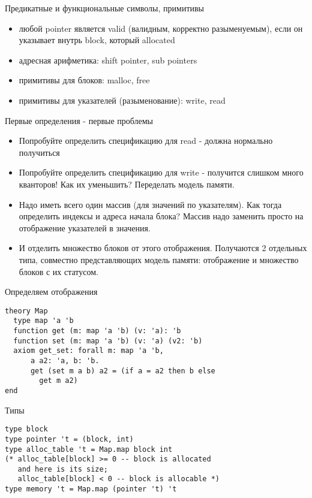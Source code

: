 \documentclass[hyperref={unicode=true}]{beamer}
\begin{document}
    \begin{frame}{Предикатные и функциональные символы, примитивы}
    \begin{itemize}
    \item
    любой pointer является valid (валидным, корректно разыменуемым), если
    он указывает внутрь block, который allocated
    \item
    адресная арифметика: shift pointer, sub pointers
    \item
    примитивы для блоков: malloc, free
    \item
    примитивы для указателей (разыменование): write, read
    \end{itemize}
    \end{frame}

    \begin{frame}{Первые определения - первые проблемы}
    \begin{itemize}
    \item
    Попробуйте определить спецификацию для read - должна нормально получиться
    \item
    Попробуйте определить спецификацию для write - получится слишком
    много кванторов! Как их уменьшить? Переделать модель памяти.
    \item
    Надо иметь всего один массив (для значений по указателям).
    Как тогда определить индексы и адреса начала блока? Массив надо заменить
    просто на отображение указателей в значения.
    \item
    И отделить множество блоков от этого отображения. Получаются 2 отдельных
    типа, совместно представляющих модель памяти: отображение и множество блоков
    с их статусом.
    \end{itemize}
    \end{frame}

    \begin{frame}[fragile]{Определяем отображения}
    \begin{lstlisting}
theory Map
  type map 'a 'b
  function get (m: map 'a 'b) (v: 'a): 'b
  function set (m: map 'a 'b) (v: 'a) (v2: 'b)
  axiom get_set: forall m: map 'a 'b,
      a a2: 'a, b: 'b.
      get (set m a b) a2 = (if a = a2 then b else
        get m a2)
end
    \end{lstlisting}
    \end{frame}

    \begin{frame}[fragile]{Типы}
    \begin{lstlisting}
type block
type pointer 't = (block, int)
type alloc_table 't = Map.map block int
(* alloc_table[block] >= 0 -- block is allocated
   and here is its size;
   alloc_table[block] < 0 -- block is allocable *)
type memory 't = Map.map (pointer 't) 't
    \end{lstlisting}
    \end{frame}
\end{document}
